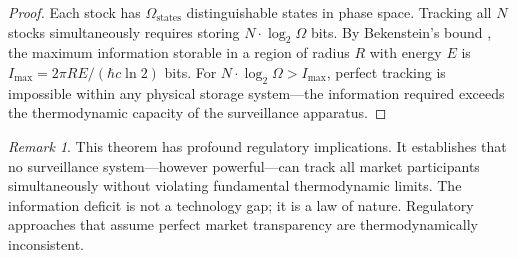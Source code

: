 \documentclass[twocolumn,10pt]{article}
\theoremstyle{remark}
\newtheorem{remark}[theorem]{Remark}
\begin{document}
\begin{proof}
Each stock has $\Omega_{\mathrm{states}}$ distinguishable states in phase space.  Tracking all $N$ stocks simultaneously requires storing $N \cdot \log_2 \Omega$ bits.  By Bekenstein's bound \cite{bekenstein1973}, the maximum information storable in a region of radius $R$ with energy $E$ is $I_{\max} = 2\pi RE / (\hbar c \ln 2)$ bits.  For $N \cdot \log_2 \Omega > I_{\max}$, perfect tracking is impossible within any physical storage system---the information required exceeds the thermodynamic capacity of the surveillance apparatus.
\end{proof}

\begin{remark}
This theorem has profound regulatory implications.  It establishes that no surveillance system---however powerful---can track all market participants simultaneously without violating fundamental thermodynamic limits.  The information deficit is not a technology gap; it is a law of nature.  Regulatory approaches that assume perfect market transparency are thermodynamically inconsistent.
\end{remark}
\end{document}
